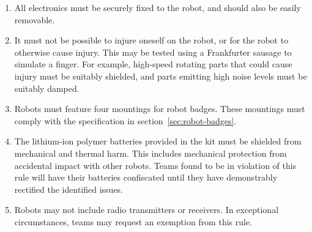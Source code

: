 \begin{enumerate}
\item All electronics must be securely fixed to the robot, and should also be easily removable.

\item It must not be possible to injure oneself on the robot, or for the robot to otherwise cause injury.
      This may be tested using a Frankfurter sausage to simulate a finger.
      For example, high-speed rotating parts that could cause injury
      must be suitably shielded, and parts emitting high noise levels
      must be suitably damped.

\item Robots must feature four mountings for robot badges.
      These mountings must comply with the specification in section~\ref{sec:robot-badges}.

\item The lithium-ion polymer batteries provided in the kit must be shielded from mechanical and thermal harm.
      This includes mechanical protection from accidental impact with other robots.
      Teams found to be in violation of this rule will have their batteries confiscated until they have demonstrably rectified the identified issues.

\item Robots may not include radio transmitters or receivers.
      In exceptional circumstances, teams may request an exemption from this rule.

\end{enumerate}
